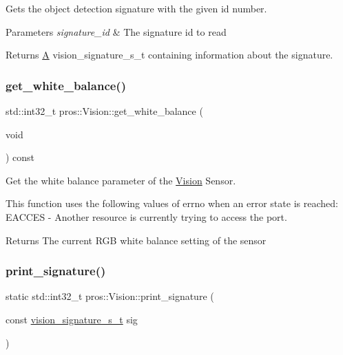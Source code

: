 Gets the object detection signature with the given id number. 


\begin{DoxyParams}{Parameters}
{\em signature\+\_\+id} & The signature id to read\\
\hline
\end{DoxyParams}
\begin{DoxyReturn}{Returns}
\mbox{\hyperlink{structA}{A}} vision\+\_\+signature\+\_\+s\+\_\+t containing information about the signature. 
\end{DoxyReturn}
\mbox{\label{classpros_1_1Vision_a7a89ad6812bfd46e24e69e1dc2f55039}} 
\subsubsection{\texorpdfstring{get\_white\_balance()}{get\_white\_balance()}}
{\footnotesize\ttfamily std\+::int32\+\_\+t pros\+::\+Vision\+::get\+\_\+white\+\_\+balance (\begin{DoxyParamCaption}\item[{void}]{ }\end{DoxyParamCaption}) const}



Get the white balance parameter of the \mbox{\hyperlink{classpros_1_1Vision}{Vision}} Sensor. 

This function uses the following values of errno when an error state is reached\+: E\+A\+C\+C\+ES -\/ Another resource is currently trying to access the port.

\begin{DoxyReturn}{Returns}
The current R\+GB white balance setting of the sensor 
\end{DoxyReturn}
\mbox{\label{classpros_1_1Vision_ada22311366ce088fa9ac08a8e3510800}} 
\subsubsection{\texorpdfstring{print\_signature()}{print\_signature()}}
{\footnotesize\ttfamily static std\+::int32\+\_\+t pros\+::\+Vision\+::print\+\_\+signature (\begin{DoxyParamCaption}\item[{const \mbox{\hyperlink{vision_8h_a135c729c7277f6cc019c2924088a5fd5}{vision\+\_\+signature\+\_\+s\+\_\+t}}}]{sig }\end{DoxyParamCaption})\hspace{0.3cm}{\ttfamily [static]}}



